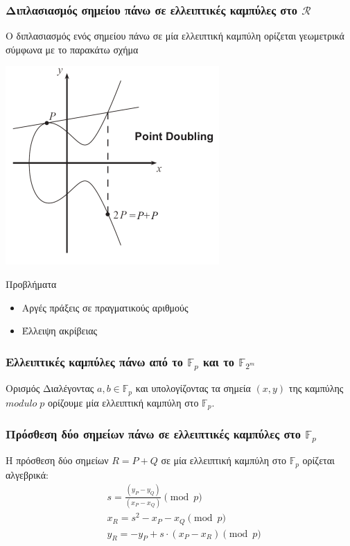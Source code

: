 \documentclass{beamer}
\begin{document}
%
\begin{frame}
\frametitle{Διπλασιασμός σημείου πάνω σε ελλειπτικές καμπύλες στο $\mathcal{R}$}
Ο διπλασιασμός ενός σημείου πάνω σε μία ελλειπτική καμπύλη ορίζεται γεωμετρικά σύμφωνα με το παρακάτω σχήμα
\begin{center}
\includegraphics[scale=0.5]{double.png}

\end{center}\end{frame}

%
\begin{frame}
\begin{block}
{Προβλήματα}
\begin{itemize}
\item Αργές πράξεις σε πραγματικούς αριθμούς
\item Έλλειψη ακρίβειας
\end{itemize}
\end{block}
\end{frame}

%
\begin{frame}
\frametitle{Ελλειπτικές καμπύλες πάνω από το $\mathbb{F}_p$ και το $\mathbb{F}_{2^m}$}
\begin{block}
{Ορισμός}
Διαλέγοντας $a,b \in \mathbb{F}_p$  και υπολογίζοντας τα σημεία $(x,y)$ της καμπύλης $modulo \; p$ ορίζουμε μία ελλειπτική καμπύλη στο $\mathbb{F}_p$.
\end{block}
\end{frame}

%
\begin{frame}
\frametitle{Πρόσθεση δύο σημείων πάνω σε ελλειπτικές καμπύλες στο $\mathbb{F}_p$}
H πρόσθεση δύο σημείων $R = P + Q$ σε μία ελλειπτική καμπύλη στο $\mathbb{F}_p$ ορίζεται αλγεβρικά:
 \begin{align*}
 & s = \frac{(y_P - y_Q)}{(x_P - x_Q)}  \pmod p \\
 & x_R = s^2 - x_P - x_Q \pmod p \\
 & y_R = -y_P + s \cdot (x_P - x_R) \pmod p
 \end{align*}
\end{frame}
\end{document}
